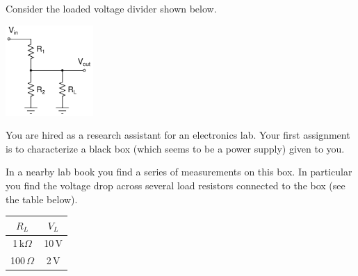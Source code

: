 \documentclass[letterpaper,addpoints,answers]{exam}
\begin{document}
\begin{questions}

\question

Consider the loaded voltage divider shown below.
\begin{center}
 \includegraphics[width=0.25\textwidth]{./schematics/loaded_voltage_divider}
\end{center}


\pagebreak

\question

You are hired as a research assistant for an electronics lab. Your first
assignment is to characterize a black box (which seems to be a power
supply) given to you.

In a nearby lab book you find a series of measurements on this box.
In particular you find the voltage drop across several load resistors
connected to the box (see the table below).

\begin{center}
 \begin{tabular}{|c|c|}
  \hline
   $R_L$         &  $V_L$ \\ 
  \hline
   1\,k$\Omega$  &  10\,V \\
   100\,$\Omega$ &  2\,V  \\
  \hline
 \end{tabular}
\end{center}
 

\end{questions}
\end{document}
